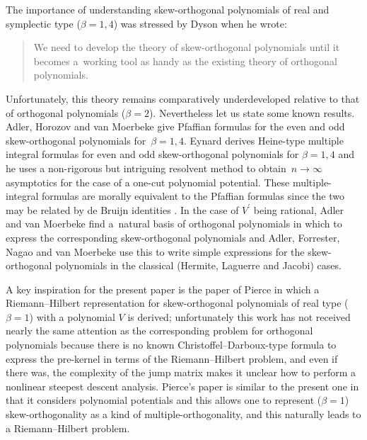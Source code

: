 \documentclass[pdftex]{sigma}
\numberwithin{equation}{section}
\begin{document}
The importance of understanding skew-orthogonal polynomials of real and symplectic type ($\beta = 1,4$) was stressed by Dyson \cite{Dyson} when he wrote:
\begin{quote}
We need to develop the theory of skew-orthogonal polynomials until it becomes a~working tool as handy as the existing theory of orthogonal polynomials.
\end{quote}
Unfortunately, this theory remains comparatively underdeveloped relative to that of orthogonal polynomials ($\beta =2$). Nevertheless let us state some known results. Adler, Horozov and van Moerbeke \cite{Adler1999ThePL} give Pfaffian formulas for the even and odd skew-orthogonal polynomials for~${\beta=1,4}$. Eynard \cite{Eynard:2001aa} derives Heine-type multiple integral formulas for even and odd skew-orthogonal polynomials for $\beta =1,4$ and he uses a non-rigorous but intriguing resolvent method to obtain~${n \to \infty}$ asymptotics for the case of a one-cut polynomial potential. These multiple-integral formulas are morally equivalent to the Pfaffian formulas since the two may be related by de Bruijn identities \cite{debruijn}. In the case of $V^\prime$ being rational, Adler and van Moerbeke \cite{adler1999pfaff} find a~natural basis of orthogonal polynomials in which to express the corresponding skew-orthogonal polynomials and Adler, Forrester, Nagao and van Moerbeke \cite{Adler:2000aa} use this to write simple expressions for the skew-orthogonal polynomials in the classical (Hermite, Laguerre and Jacobi) cases.

A key inspiration for the present paper is the paper of Pierce \cite{PIERCE2008230} in which a Riemann--Hilbert representation for skew-orthogonal polynomials of real type ($\beta = 1$) with a polynomial $V$ is derived; unfortunately this work has not received nearly the same attention as the corresponding problem for orthogonal polynomials because there is no known Christoffel--Darboux-type formula to express the pre-kernel in terms of the Riemann--Hilbert problem, and even if there was, the complexity of the jump matrix makes it unclear how to perform a nonlinear steepest descent analysis. Pierce's paper is similar to the present one in that it considers polynomial potentials and this allows one to represent ($\beta = 1$) skew-orthogonality as a kind of multiple-orthogonality, and this naturally leads to a Riemann--Hilbert problem.
\end{document}
